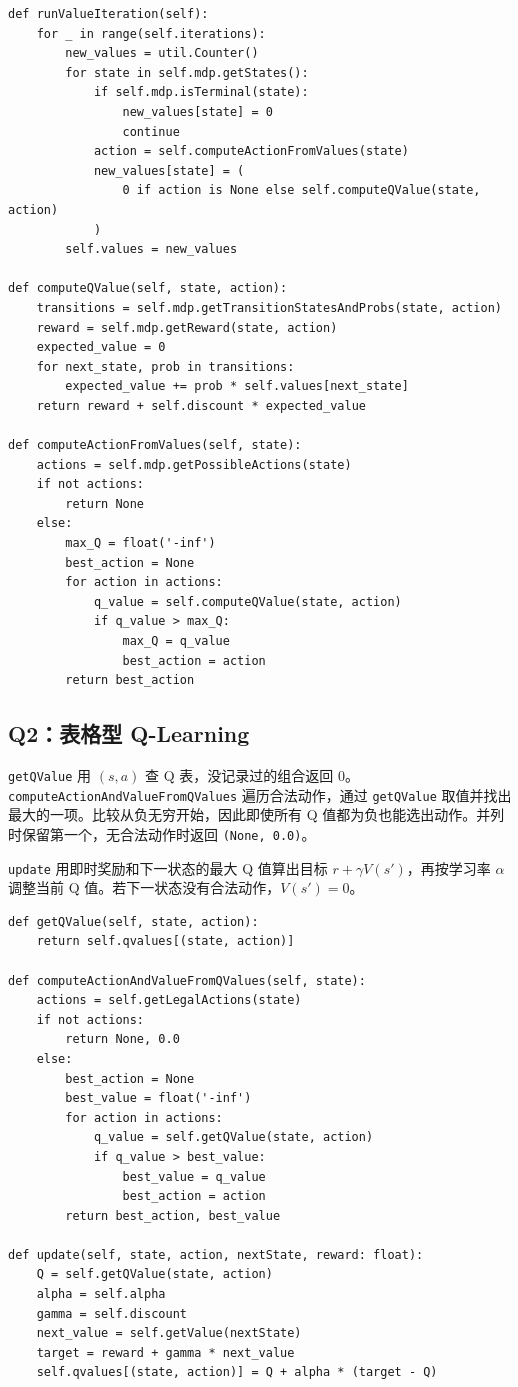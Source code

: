 \documentclass[UTF8,fontset=fandol,a4paper,11pt]{ctexart}
\newcommand{\code}[1]{\texttt{#1}}
\begin{document}
\begin{lstlisting}
def runValueIteration(self):
    for _ in range(self.iterations):
        new_values = util.Counter()
        for state in self.mdp.getStates():
            if self.mdp.isTerminal(state):
                new_values[state] = 0
                continue
            action = self.computeActionFromValues(state)
            new_values[state] = (
                0 if action is None else self.computeQValue(state, action)
            )
        self.values = new_values

def computeQValue(self, state, action):
    transitions = self.mdp.getTransitionStatesAndProbs(state, action)
    reward = self.mdp.getReward(state, action)
    expected_value = 0
    for next_state, prob in transitions:
        expected_value += prob * self.values[next_state]
    return reward + self.discount * expected_value

def computeActionFromValues(self, state):
    actions = self.mdp.getPossibleActions(state)
    if not actions:
        return None
    else:
        max_Q = float('-inf')
        best_action = None
        for action in actions:
            q_value = self.computeQValue(state, action)
            if q_value > max_Q:
                max_Q = q_value
                best_action = action
        return best_action
\end{lstlisting}

\newpage
\subsection{Q2：表格型 Q-Learning}

\code{getQValue} 用 $(s,a)$ 查 Q 表，没记录过的组合返回 0。\code{computeActionAndValueFromQValues} 遍历合法动作，通过 \code{getQValue} 取值并找出最大的一项。比较从负无穷开始，因此即使所有 Q 值都为负也能选出动作。并列时保留第一个，无合法动作时返回 \code{(None, 0.0)}。

\code{update} 用即时奖励和下一状态的最大 Q 值算出目标 $r+\gamma V(s')$，再按学习率 $\alpha$ 调整当前 Q 值。若下一状态没有合法动作，$V(s')=0$。
\begin{lstlisting}
def getQValue(self, state, action):
    return self.qvalues[(state, action)]

def computeActionAndValueFromQValues(self, state):
    actions = self.getLegalActions(state)
    if not actions:
        return None, 0.0
    else:
        best_action = None
        best_value = float('-inf')
        for action in actions:
            q_value = self.getQValue(state, action)
            if q_value > best_value:
                best_value = q_value
                best_action = action
        return best_action, best_value

def update(self, state, action, nextState, reward: float):
    Q = self.getQValue(state, action)
    alpha = self.alpha
    gamma = self.discount
    next_value = self.getValue(nextState)
    target = reward + gamma * next_value
    self.qvalues[(state, action)] = Q + alpha * (target - Q)
\end{lstlisting}
\end{document}
